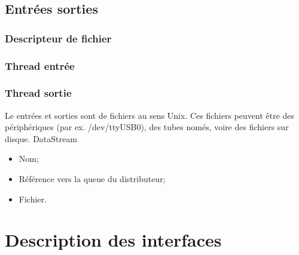 \documentclass[a4paper,11pt]{report}
\begin{document}
\section{Entrées sorties}

\subsection{Descripteur de fichier}
\subsection{Thread entrée}
\subsection{Thread sortie}

Le entrées et sorties sont de fichiers au sens Unix.
Ces fichiers peuvent être des périphériques (par ex. /dev/ttyUSB0), des tubes només,
voire des fichiers sur disque.
DataStream
\begin{itemize}
	\item Nom;
	\item Référence vers la queue du distributeur;
	\item Fichier.
\end{itemize}



\chapter{Description des interfaces}
\end{document}
